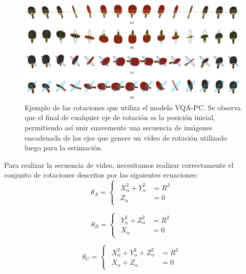\begin{figure}
  \begin{center}
    \includegraphics[width=\textwidth]{imagenes/chapter4/VQARotation}
  \end{center}
  \caption[Ejemplo de las rotaciones que utiliza el modelo VQA-PC.]
  {Ejemplo de las rotaciones que utiliza el modelo VQA-PC.
  Se observa que el final de cualquier eje de rotación es la posición inicial, 
permitiendo así unir suavemente una secuencia de imágenes encadenada de los ejes 
que genere un vídeo de rotación utilizado luego para la estimación.}
  \label{fig:VQARotation}
\end{figure}

Para realizar la secuencia de vídeo, necesitamos realizar correctamente 
el conjunto de rotaciones descritos por las siguientes ecuaciones: 
\begin{equation}
  \theta_A = 
\begin{cases}
\begin{aligned}
   X_\alpha^2 + Y_\alpha^2 & = R^2 \\ 
    Z_\alpha & = 0 
\end{aligned}
\end{cases}
\label{eq:RotationA}
\end{equation}

\begin{equation}
  \theta_B = 
\begin{cases}
\begin{aligned}
   Y_\alpha^2 + Z_\alpha^2 & = R^2 \\ 
    X_\alpha & = 0 
\end{aligned}
\end{cases}
\label{eq:RotationB}
\end{equation}

\begin{equation}
  \theta_C = 
\begin{cases}
\begin{aligned}
   X_\alpha^2 + Y_\alpha^2 + Z_\alpha^2 & = R^2 \\ 
    X_\alpha + Z_\alpha & = 0 
\end{aligned}
\end{cases}
\label{eq:RotationC}
\end{equation}

